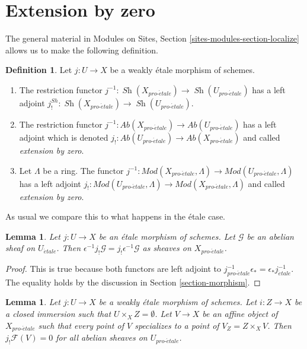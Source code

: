 \documentclass{stacks-project}
\theoremstyle{plain}
\newtheorem{lemma}[subsection]{Lemma}
\theoremstyle{definition}
\newtheorem{definition}[subsection]{Definition}
\theoremstyle{remark}
\numberwithin{equation}{subsection}
\def\Sh{\mathop{\mathit{Sh}}\nolimits}
\def\proetale{{pro\text{-}\acute{e}tale}}
\def\etale{{\acute{e}tale}}
\begin{document}
\section{Extension by zero}
\label{section-extension-by-zero}

\noindent
The general material in
Modules on Sites, Section \ref{sites-modules-section-localize}
allows us to make the following definition.

\begin{definition}
\label{definition-extension-zero}
Let $j : U \to X$ be a weakly \'etale morphism of schemes.
\begin{enumerate}
\item The restriction functor
$j^{-1} : \Sh(X_\proetale) \to \Sh(U_\proetale)$
has a left adjoint
$j_!^{Sh} : \Sh(X_\proetale) \to \Sh(U_\proetale)$.
\item The restriction functor
$j^{-1} : \textit{Ab}(X_\proetale) \to \textit{Ab}(U_\proetale)$
has a left adjoint which is denoted
$j_! : \textit{Ab}(U_\proetale) \to \textit{Ab}(X_\proetale)$
and called {\it extension by zero}.
\item Let $\Lambda$ be a ring. The functor
$j^{-1} : \textit{Mod}(X_\proetale, \Lambda) \to
\textit{Mod}(U_\proetale, \Lambda)$
has a left adjoint
$j_! : \textit{Mod}(U_\proetale, \Lambda) \to
\textit{Mod}(X_\proetale, \Lambda)$
and called {\it extension by zero}.
\end{enumerate}
\end{definition}

\noindent
As usual we compare this to what happens in the \'etale case.

\begin{lemma}
\label{lemma-jshriek-comparison}
Let $j : U \to X$ be an \'etale morphism of schemes.
Let $\mathcal{G}$ be an abelian sheaf on $U_\etale$.
Then $\epsilon^{-1} j_!\mathcal{G} = j_!\epsilon^{-1}\mathcal{G}$
as sheaves on $X_\proetale$.
\end{lemma}

\begin{proof}
This is true because both functors are left adjoint to
$j_\proetale^{-1} \epsilon_* = \epsilon_* j_\etale^{-1}$.
The equality holds by the discussion in Section \ref{section-morphism}.
\end{proof}

\begin{lemma}
\label{lemma-jshriek-zero}
Let $j : U \to X$ be a weakly \'etale morphism of schemes.
Let $i : Z \to X$ be a closed immersion such that $U \times_X Z = \emptyset$.
Let $V \to X$ be an affine object of $X_\proetale$ such that every point
of $V$ specializes to a point of $V_Z = Z \times_X V$.
Then $j_!\mathcal{F}(V) = 0$ for all abelian sheaves on $U_\proetale$.
\end{lemma}
\end{document}
